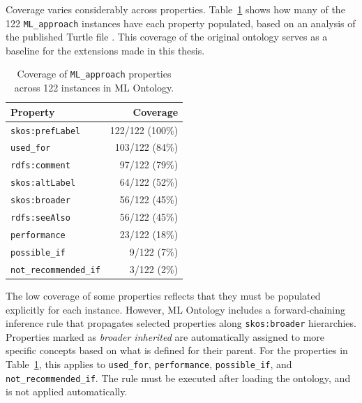 Coverage varies considerably across properties.
Table~\ref{tab:ml-approach-coverage} shows how many of the 122
\texttt{ML\_approach} instances have each property populated, based
on an analysis of the published Turtle file
\parencite[Section~6.7]{humm2026industry_ready_machine_learning_ontology}.
This coverage of the original ontology serves as a baseline for the
extensions made in this thesis.

\begin{table}[H]
\centering
\caption[ML\_approach property coverage]{Coverage of 
\texttt{ML\_approach} properties across 122 instances in 
ML Ontology.}
\label{tab:ml-approach-coverage}
\begin{tabular}{lr}
\toprule
\textbf{Property} & \textbf{Coverage} \\
\midrule
\texttt{skos:prefLabel}       & 122/122 (100\%) \\
\texttt{used\_for}           & 103/122 (84\%)  \\
\texttt{rdfs:comment}         & 97/122 (79\%)   \\
\texttt{skos:altLabel}        & 64/122 (52\%)   \\
\texttt{skos:broader}         & 56/122 (45\%)   \\
\texttt{rdfs:seeAlso}         & 56/122 (45\%)   \\
\texttt{performance}         & 23/122 (18\%)   \\
\texttt{possible\_if}        & 9/122 (7\%)     \\
\texttt{not\_recommended\_if}& 3/122 (2\%)     \\
\bottomrule
\end{tabular}
\end{table}

The low coverage of some properties reflects that they must 
be populated explicitly for each instance. However, ML Ontology 
includes a forward-chaining inference rule that propagates 
selected properties along \texttt{skos:broader} hierarchies. 
Properties marked as \textit{broader inherited} are 
automatically assigned to more specific concepts based on 
what is defined for their parent. For the properties in 
Table~\ref{tab:ml-approach-coverage}, this applies to 
\texttt{used\_for},
\texttt{performance}, \texttt{possible\_if}, and 
\texttt{not\_recommended\_if}. The rule must be executed 
after loading the ontology, and is not applied automatically.

